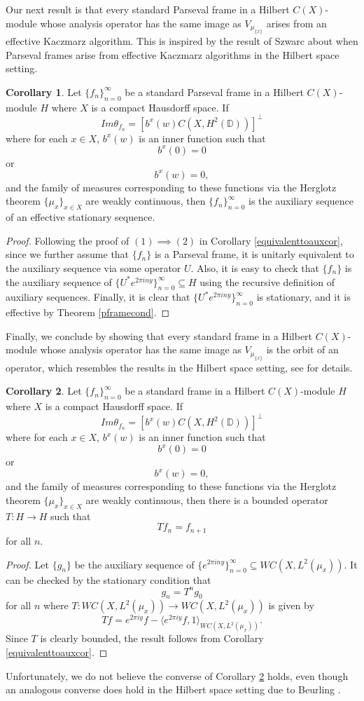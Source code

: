 \documentclass[11pt]{amsart}
\theoremstyle{definition}
\newtheorem{cor}{Corollary}[section]
\numberwithin{equation}{section}
\begin{document}
Our next result is that every standard Parseval frame in a Hilbert $C(X)$-module whose analysis operator has the same image as $V_{\mu_{\{x\}}}$ arises from an effective Kaczmarz algorithm. This is inspired by the result of Szwarc \cite{Szwarc2007Kaczmarz} about when Parseval frames arise from effective Kaczmarz algorithms in the Hilbert space setting.
\begin{cor}
Let $\{f_{n}\}_{n=0}^{\infty}$ be a standard Parseval frame in a Hilbert $C(X)$-module $H$ where $X$ is a compact Hausdorff space. If $$Im\theta_{f_{n}}=[b^{x}(w)C(X, H^{2}(\mathbb{D}))]^{\perp}$$ where for each $x\in X$, $b^{x}(w)$ is an inner function such that $$b^{x}(0)=0$$ or $$b^{x}(w)=0,$$ and the family of measures corresponding to these functions via the Herglotz theorem $\{\mu_{x}\}_{x\in X}$ are weakly continuous, then $\{f_{n}\}_{n=0}^{\infty}$ is the auxiliary sequence of an effective stationary sequence.
\end{cor}
\begin{proof}
Following the proof of $(1)\implies (2)$ in Corollary \ref{equivalenttoauxcor}, since we further assume that $\{f_{n}\}$ is a Parseval frame, it is unitarly equivalent to the auxiliary sequence via some operator $U$. Also, it is easy to check that $\{f_{n}\}$ is the auxiliary sequence of $\{U^{*}e^{2\pi i ny}\}_{n=0}^{\infty}\subseteq H$ using the recursive definition of auxiliary sequences. Finally, it is clear that $\{U^{*}e^{2\pi i ny}\}_{n=0}^{\infty}$ is stationary, and it is effective by Theorem \ref{pframecond}.
\end{proof}
Finally, we conclude by showing that every standard frame in a Hilbert $C(X)$-module whose analysis operator has the same image as $V_{\mu_{\{x\}}}$ is the orbit of an operator, which resembles the results in the Hilbert space setting, see \cite{Christensen2020Frame} for details.
\begin{cor}\label{orbitframeresult}
Let $\{f_{n}\}_{n=0}^{\infty}$ be a standard frame in a Hilbert $C(X)$-module $H$ where $X$ is a compact Hausdorff space. If $$Im\theta_{f_{n}}=[b^{x}(w)C(X, H^{2}(\mathbb{D}))]^{\perp}$$ where for each $x\in X$, $b^{x}(w)$ is an inner function such that $$b^{x}(0)=0$$ or $$b^{x}(w)=0,$$ and the family of measures corresponding to these functions via the Herglotz theorem $\{\mu_{x}\}_{x\in X}$ are weakly continuous, then there is a bounded operator $T:H \to H$ such that 
$$Tf_{n}=f_{n+1}$$ for all $n$.
\end{cor}
\begin{proof}
Let $\{g_{n}\}$ be the auxiliary sequence of $\{e^{2\pi i ny}\}_{n=0}^{\infty}\subseteq WC(X, L^{2}(\mu_{x}))$. It can be checked by the stationary condition that $$g_{n}=T^{n}g_{0}$$ for all $n$ where $T:WC(X, L^{2}(\mu_{x}))\to WC(X, L^{2}(\mu_{x})) $ is given by
$$Tf=e^{2\pi i y}f-\langle e^{2\pi i y}f, 1\rangle_{WC(X, L^{2}(\mu_{x}))} .$$
Since $T$ is clearly bounded, the result follows from Corollary \ref{equivalenttoauxcor}.
\end{proof}

Unfortunately, we do not believe the converse of Corollary \ref{orbitframeresult} holds, even though an analogous converse does hold in the Hilbert space setting due to Beurling \cite{Beurling1948Two}.

\printbibliography
\end{document}
